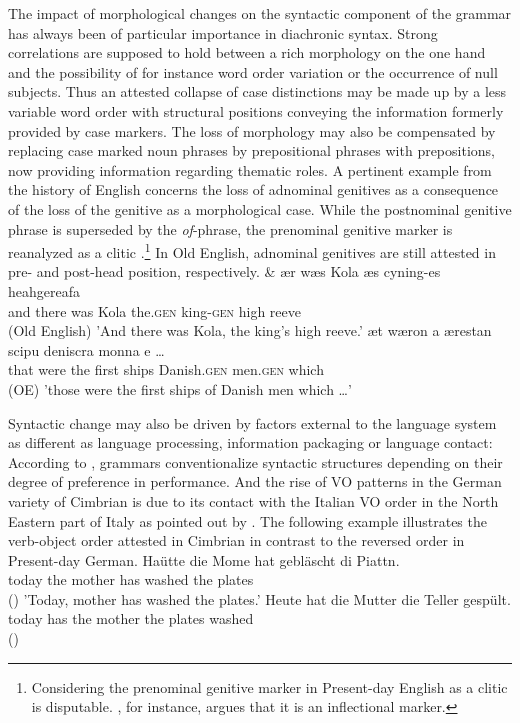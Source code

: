 \documentclass[output=paper
                ,modfonts
                ,nonflat
	        ,collection
	        ,collectionchapter
	        ,collectiontoclongg
 	        ,biblatex
                ,babelshorthands
                ,newtxmath
                ,draftmode
                ,colorlinks, citecolor=brown
]{./langsci/langscibook}
\begin{document}
The impact of morphological changes on the syntactic component of the grammar has always been of particular importance in diachronic syntax. Strong correlations are supposed to hold between a rich morphology on the one hand and the possibility of for instance word order variation or the occurrence of null subjects. Thus an attested collapse of case distinctions may be made up by a less variable word order with structural positions conveying the information formerly provided by case markers. The loss of morphology may also be compensated by replacing case marked noun phrases by prepositional phrases with prepositions, now providing information regarding thematic roles. A pertinent example from the history of English concerns the loss of adnominal genitives as a consequence of the loss of the genitive as a morphological case. While the postnominal genitive phrase is superseded by the \textit{of}-phrase, the prenominal genitive marker is reanalyzed as a clitic \citep{allen2006}.\footnote{Considering the prenominal genitive marker in Present-day English as a clitic is disputable. \cite{zwicky1987}, for instance, argues that it is an inflectional marker.} In Old English, adnominal genitives are still attested in pre- and post-head position, respectively. 
\eal
\ex
\gll \& \th ær wæs Kola \dh æs cyning-es heahgereafa \\ and there was Kola the.\textsc{gen} king-\textsc{gen} {high reeve}  \\ \hfill (Old English)
\glt 'And there was Kola, the king's high reeve.' 
\ex
\gll \th æt wæron \th a ærestan scipu deniscra monna \th e \dots \\ that were the first ships Danish.\textsc{gen} men.\textsc{gen} which \\ \hfill (OE)
\glt 'those were the first ships of Danish men which \dots'
\zl

Syntactic change may also be driven by factors external to the language system as different as language processing, information packaging or language contact: According to \cite{hawkins2004}, grammars conventionalize syntactic structures depending on their degree of preference in performance. And the rise of VO patterns in the German variety of Cimbrian is due to its contact with the Italian VO order in the North Eastern part of Italy as pointed out by \cite{GrPo2005}. The following example illustrates the verb-object order attested in Cimbrian in contrast to the reversed order in Present-day German.
\eal
\ex
\gll Haütte die Mome hat gebläscht di Piattn.  \\ today the mother has washed the plates \\ \hfill ()
\glt 'Today, mother has washed the plates.' 
\ex 
\gll Heute hat die Mutter die Teller gespült.  \\ today has the mother the plates washed \\ \hfill ()
\zl
\end{document}
